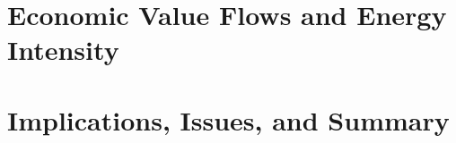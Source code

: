 \documentclass[graybox,envcountchap,sectrefs]{svmono}
\begin{document}


\part{Economic Value Flows and Energy Intensity}
\label{part:values}

 

 

\part{Implications, Issues, and Summary}
\label{part:implications}










\begin{appendices}
	
	

	

	

	

	

\end{appendices}

\backmatter%
%
%



\glstoctrue{} %
\printglossary[type=glossary, style=glossarystyle, nonumberlist=true]



\printindex{}

\end{document}
